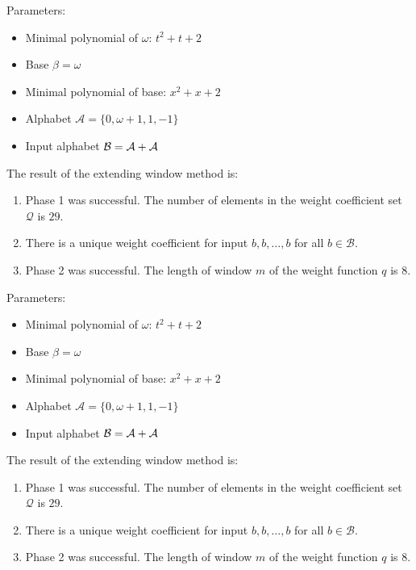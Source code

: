 \begin{exmp}
\label{ex:AA}

Parameters:
\begin{itemize}
    \item Minimal polynomial of $\omega$: $t^2 + t + 2$
    \item Base $\beta= \omega $
    \item Minimal polynomial of base: $x^2 + x + 2$
    \item Alphabet $\mathcal{A} = \{0, \omega + 1, 1, -1\} $
    \item Input alphabet $\mathcal{B} =\mathcal{A}+\mathcal{A}$
\end{itemize}

The result of the extending window method is:
\begin{enumerate}
    \item Phase 1 was successful.
The number of elements in the weight coefficient set $\mathcal{Q}$ is $ 29 $.

    \item There is a unique weight coefficient for input $b,b,\dots,b$ for all $b\in\mathcal{B}$.

    \item Phase 2 was successful.
The length of window $m$ of the weight function $q$ is  $ 8 $.
\end{enumerate}
\end{exmp}
\begin{exmp}
\label{ex:AB}

Parameters:
\begin{itemize}
    \item Minimal polynomial of $\omega$: $t^2 + t + 2$
    \item Base $\beta= \omega $
    \item Minimal polynomial of base: $x^2 + x + 2$
    \item Alphabet $\mathcal{A} = \{0, \omega + 1, 1, -1\} $
    \item Input alphabet $\mathcal{B} =\mathcal{A}+\mathcal{A}$
\end{itemize}

The result of the extending window method is:
\begin{enumerate}
    \item Phase 1 was successful.
The number of elements in the weight coefficient set $\mathcal{Q}$ is $ 29 $.

    \item There is a unique weight coefficient for input $b,b,\dots,b$ for all $b\in\mathcal{B}$.

    \item Phase 2 was successful.
The length of window $m$ of the weight function $q$ is  $ 8 $.
\end{enumerate}
\end{exmp}
